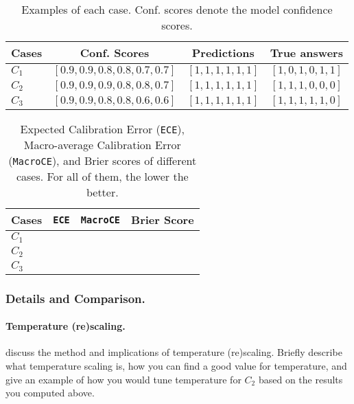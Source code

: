 \documentclass{article}
\begin{document}
\begin{table}[h]
\small
    \centering
    \begin{tabular}{l|c|c|c}
    \toprule
        Cases & Conf. Scores   & Predictions & True answers \\
         \midrule
         $C_1$ & $[0.9, 0.9, 0.8, 0.8, 0.7, 0.7]$  & $[1,1,1,1,1,1]$  & $[1,0,1,0,1,1]$ \\
         $C_2$ & $[0.9, 0.9, 0.9, 0.8, 0.8, 0.7]$  & $[1,1,1,1,1,1]$  & $[1,1,1,0,0,0]$ \\
         $C_3$ & $[0.9, 0.9, 0.8, 0.8, 0.6, 0.6]$  & $[1,1,1,1,1,1]$  & $[1,1,1,1,1,0]$ \\
         \bottomrule
    \end{tabular}
    \caption{Examples of each case. Conf. scores denote the model confidence scores.}
    \label{tab:sec3.4_cases}
\end{table}


\begin{table}[h]
\small
    \centering
    \begin{tabular}{l|c|c|c}
    \toprule
        Cases & \texttt{ECE}   & \texttt{MacroCE} & Brier Score \\
         \midrule
         $C_1$ &  &  & \\
         $C_2$ &  &  & \\
         $C_3$ &  &  & \\
         \bottomrule
    \end{tabular}
    \caption{Expected Calibration Error (\texttt{ECE}), Macro-average Calibration Error (\texttt{MacroCE}), and Brier scores of different cases. For all of them, the lower the better.}
    \label{tab:sec3.4_results}
\end{table}

\clearpage
\begin{solve}
    
\end{solve}


\subsubsection{Details and Comparison.} 
\paragraph{Temperature (re)scaling.} \cite{guo2017calibration, desai-durrett-2020-calibration} discuss the method and implications of temperature (re)scaling. Briefly describe what temperature scaling is, how you can find a good value for temperature, and give an example of how you would tune temperature for $C_2$ based on the results you computed above.
\end{document}
